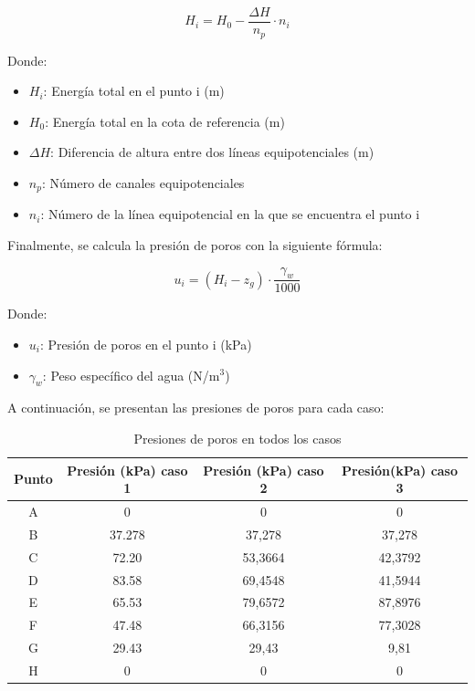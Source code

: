 \documentclass{article}
\begin{document}
\begin{equation}
  H_i = H_0 - \frac{\Delta H}{n_p} \cdot n_i
\end{equation}

Donde:
\begin{itemize}
    \item $H_i$: Energía total en el punto i (m)
    \item $H_0$: Energía total en la cota de referencia (m)
    \item $\Delta H$: Diferencia de altura entre dos líneas equipotenciales (m)
    \item $n_p$: Número de canales equipotenciales
    \item $n_i$: Número de la línea equipotencial en la que se encuentra el punto i
\end{itemize}

Finalmente, se calcula la presión de poros con la siguiente fórmula:

\begin{equation}
  u_i =  (H_i - z_g)\cdot \frac{\gamma_w}{1000}
\end{equation}

Donde:
\begin{itemize}
    \item $u_i$: Presión de poros en el punto i (kPa)
    \item $\gamma_w$: Peso específico del agua (N/m$^3$)
\end{itemize}

\newpage

A continuación, se presentan las presiones de poros para cada caso:




\begin{table}[h!]
  \centering
    \begin{tabular}{cccc}
    \hline
    \textbf{Punto} & \textbf{Presión (kPa) caso 1} & \textbf{Presión (kPa) caso 2}& \textbf{Presión(kPa) caso 3}\\
    \hline
    A &0     &  0       & 0       \\ 
    B &37.278&  37,278  & 37,278  \\ 
    C &72.20 &  53,3664 & 42,3792 \\ 
    D &83.58 &  69,4548 & 41,5944 \\ 
    E &65.53 &  79,6572 & 87,8976 \\ 
    F & 47.48&  66,3156 & 77,3028 \\ 
    G &29.43 &  29,43   & 9,81     \\ 
    H &0     &  0       & 0        \\ 
    \hline
    \end{tabular}
  \caption{Presiones de poros en todos los casos}
  \label{tab:presion2}
\end{table}
  
\end{document}
